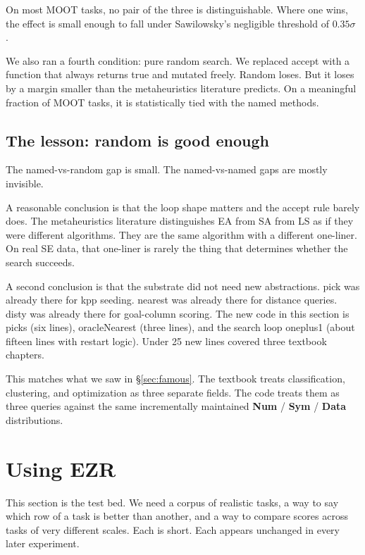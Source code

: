 \documentclass[AMA,STIX2COL]{WileyNJDv5}
\newcommand{\cls}[1]{%
  \setlength{\fboxsep}{1.5pt}%
  \colorbox{clsbg}{\sffamily\bfseries{#1}}%
}
\begin{document}
On most MOOT tasks, no pair of the three is distinguishable.
Where one wins, the effect is small enough to fall under
Sawilowsky's negligible threshold of $0.35\sigma$
\cite{sawilowsky2009new}.

We also ran a fourth condition: pure random search. We replaced
\textsf{accept} with a function that always returns true and
mutated freely. Random loses. But it loses by a margin smaller
than the metaheuristics literature predicts. On a meaningful
fraction of MOOT tasks, it is statistically tied with the named
methods.

\subsection*{The lesson: random is good enough}

The named-vs-random gap is small. The named-vs-named gaps are
mostly invisible.

A reasonable conclusion is that the loop shape matters and the
accept rule barely does. The metaheuristics literature
distinguishes EA from SA from LS as if they were different
algorithms. They are the same algorithm with a different
one-liner. On real SE data, that one-liner is rarely the thing
that determines whether the search succeeds.

A second conclusion is that the substrate did not need new
abstractions. \textsf{pick} was already there for kpp seeding.
\textsf{nearest} was already there for distance queries.
\textsf{disty} was already there for goal-column scoring. The
new code in this section is \textsf{picks} (six lines),
\textsf{oracleNearest} (three lines), and the search loop
\textsf{oneplus1} (about fifteen lines with restart logic).
Under 25 new lines covered three textbook chapters.

This matches what we saw in \S\ref{sec:famous}. The textbook
treats classification, clustering, and optimization as three
separate fields. The code treats them as three queries against
the same incrementally maintained
\cls{Num}/\cls{Sym}/\cls{Data} distributions.

\section{Using EZR}\label{sec:using}

This section is the test bed. We need a corpus of realistic
tasks, a way to say which row of a task is better than another,
and a way to compare scores across tasks of very different
scales. Each is short. Each appears unchanged in every later
experiment.
\end{document}
